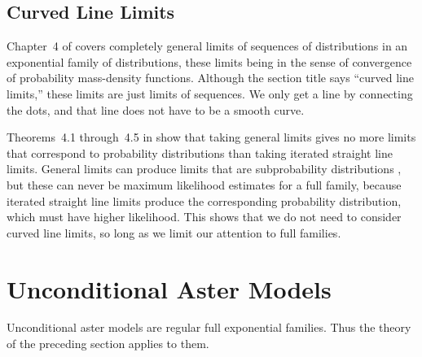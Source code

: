 \subsection{Curved Line Limits}

Chapter~4 of \citet{geyer-thesis} covers completely general
limits of sequences of distributions in an exponential family of distributions,
these limits being in the sense of convergence of probability mass-density
functions.  Although the section title says ``curved line limits,'' these
limits are just limits of sequences.  We only get a line by connecting
the dots, and that line does not have to be a smooth curve.

Theorems~4.1 through~{4.5} in \citet{geyer-thesis} show that taking general
limits gives no more limits that correspond to probability distributions
than taking iterated straight line limits.  General limits can produce
limits that are subprobability distributions
\citep[Examples~4.2 through~4.4]{geyer-thesis}, but these can never be
maximum likelihood estimates for a full family, because iterated straight
line limits produce the corresponding probability distribution, which must
have higher likelihood.
This shows that we do not need to consider curved line limits, so long
as we limit our attention to full families.

\section{Unconditional Aster Models}

Unconditional aster models are regular full exponential families.
Thus the theory of the preceding section applies to them.

